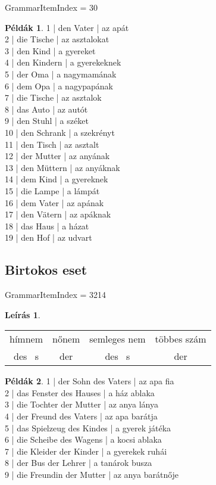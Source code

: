 \documentclass{article}
\theoremstyle{definition}
\newtheorem*{exmp}{Példák}
\newtheorem*{desc}{Leírás}
\begin{document}
GrammarItemIndex = 30

\begin{exmp}
1 | den Vater | az apát\\
2 | die Tische | az asztalokat\\
3 | den Kind | a gyereket\\
4 | den Kindern | a gyerekeknek\\
5 | der Oma | a nagymamának\\
6 | dem Opa | a nagypapának\\
7 | die Tische | az asztalok\\
8 | das Auto | az autót\\
9 | den Stuhl | a széket\\
10 | den Schrank | a szekrényt\\
11 | den Tisch | az asztalt\\
12 | der Mutter | az anyának\\
13 | den Müttern | az anyáknak\\
14 | dem Kind | a gyereknek\\
15 | die Lampe | a lámpát\\
16 | dem Vater | az apának\\
17 | den Vätern | az apáknak\\
18 | das Haus | a házat\\
19 | den Hof | az udvart\\
\end{exmp}

\subsection{Birtokos eset}

GrammarItemIndex = 3214

\begin{desc}
\begin{tabular}{cccc}
hímnem & nőnem & semleges nem & többes szám\\
des ~s & der & des ~s & der\\
\end{tabular}
\end{desc}

\begin{exmp}
1 | der Sohn des Vaters | az apa fia\\
2 | das Fenster des Hauses | a ház ablaka\\
3 | die Tochter der Mutter | az anya lánya\\
4 | der Freund des Vaters | az apa barátja\\
5 | das Spielzeug des Kindes | a gyerek játéka\\
6 | die Scheibe des Wagens | a kocsi ablaka\\
7 | die Kleider der Kinder | a gyerekek ruhái\\
8 | der Bus der Lehrer | a tanárok busza\\
9 | die Freundin der Mutter | az anya barátnője\\
\end{exmp}
\end{document}
